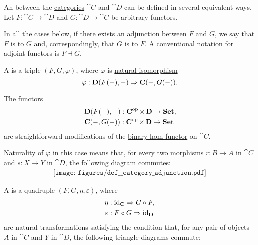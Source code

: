 \begin{definition}\label{def:category_adjunction}
  An  between the \hyperref[def:category]{categories} \( \cat{C} \) and \( \cat{D} \) can be defined in several equivalent ways. Let \( F: \cat{C} \to \cat{D} \) and \( G: \cat{D} \to \cat{C} \) be arbitrary functors.

  In all the cases below, if there exists an adjunction between \( F \) and \( G \), we say that \( F \) is  to \( G \) and, correspondingly, that \( G \) is  to \( F \). A conventional notation for adjoint functors is \( F \dashv G \).

  \begin{thmenum}
     A  is a triple \( (F, G, \varphi) \), where \( \varphi \) is \hyperref[thm:natural_isomorphism]{natural isomorphism}
    \begin{equation}\label{eq:def:category_adjunction/hom}
      \varphi: \cat{D}(F(\anon*), \anon*) \Rightarrow \cat{C}(\anon*, G(\anon*)).
    \end{equation}

    The functors
    \begin{align*}
      &\cat{D}(F(\anon*), \anon*): \cat{C}^{\opcat} \times \cat{D} \to \cat{Set}, \\
      &\cat{C}(\anon*, G(\anon*)): \cat{C}^{\opcat} \times \cat{D} \to \cat{Set}
    \end{align*}
    are straightforward modifications of the \hyperref[eq:def:hom_functor/binary]{binary hom-functor} on \( \cat{C} \).

    Naturality of \( \varphi \) in this case means that, for every two morphisms \( r: B \to A \) in \( \cat{C} \) and \( s: X \to Y \) in \( \cat{D} \), the following diagram commutes:
    \begin{equation}\label{eq:def:category_adjunction/varphi_nat}
      \begin{aligned}
        \texttt{[image: figures/def\_\_category\_adjunction.pdf]}
      \end{aligned}
    \end{equation}

     A  is a quadruple \( (F, G, \eta, \varepsilon) \), where
    \begin{equation}\label{eq:def:category_adjunction/unit_counit/signature}
      \begin{aligned}
               \eta &: \id_{\cat{C}} \Rightarrow G \bincirc F, \\
        \varepsilon &: F \bincirc G \Rightarrow \id_{\cat{D}}
      \end{aligned}
    \end{equation}
    are natural transformations satisfying the condition that, for any pair of objects \( A \) in \( \cat{C} \) and \( Y \) in \( \cat{D} \), the following triangle diagrams commute:


\end{thmenum}
\end{definition}
